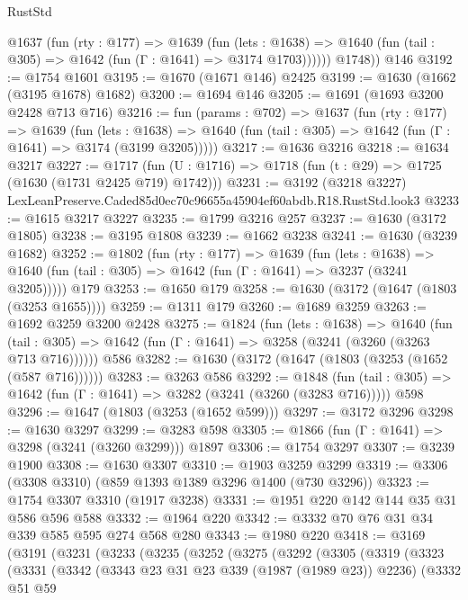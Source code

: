 \begin{lexlean}{RustStd}
\begin{coremodule}
          @1637
            (fun (rty : @177) =>
            @1639
              (fun (lets : @1638) =>
              @1640 (fun (tail : @305) => @1642 (fun (Γ : @1641) => @3174 @1703))))))
        @1748))
    @146
@3192 := @1754 @1601
@3195 := @1670 (@1671 @146) @2425
@3199 := @1630 (@1662 (@3195 @1678) @1682)
@3200 := @1694 @146
@3205 := @1691 (@1693 @3200 @2428 @713 @716)
@3216 := fun (params : @702) =>
  @1637
    (fun (rty : @177) =>
    @1639
      (fun (lets : @1638) =>
      @1640 (fun (tail : @305) => @1642 (fun (Γ : @1641) => @3174 (@3199 @3205)))))
@3217 := @1636 @3216
@3218 := @1634 @3217
@3227 := @1717 (fun (U : @1716) => @1718 (fun (t : @29) => @1725 (@1630 (@1731 @2425 @719) @1742)))
@3231 := @3192 (@3218 @3227) LexLeanPreserve.Caded85d0ec70c96655a45904ef60abdb.R18.RustStd.look3
@3233 := @1615 @3217 @3227
@3235 := @1799 @3216 @257
@3237 := @1630 (@3172 @1805)
@3238 := @3195 @1808
@3239 := @1662 @3238
@3241 := @1630 (@3239 @1682)
@3252 := @1802
    (fun (rty : @177) =>
    @1639
      (fun (lets : @1638) =>
      @1640 (fun (tail : @305) => @1642 (fun (Γ : @1641) => @3237 (@3241 @3205)))))
    @179
@3253 := @1650 @179
@3258 := @1630 (@3172 (@1647 (@1803 (@3253 @1655))))
@3259 := @1311 @179
@3260 := @1689 @3259
@3263 := @1692 @3259 @3200 @2428
@3275 := @1824
    (fun (lets : @1638) =>
    @1640 (fun (tail : @305) => @1642 (fun (Γ : @1641) => @3258 (@3241 (@3260 (@3263 @713 @716))))))
    @586
@3282 := @1630 (@3172 (@1647 (@1803 (@3253 (@1652 (@587 @716))))))
@3283 := @3263 @586
@3292 := @1848
    (fun (tail : @305) => @1642 (fun (Γ : @1641) => @3282 (@3241 (@3260 (@3283 @716)))))
    @598
@3296 := @1647 (@1803 (@3253 (@1652 @599)))
@3297 := @3172 @3296
@3298 := @1630 @3297
@3299 := @3283 @598
@3305 := @1866 (fun (Γ : @1641) => @3298 (@3241 (@3260 @3299))) @1897
@3306 := @1754 @3297
@3307 := @3239 @1900
@3308 := @1630 @3307
@3310 := @1903 @3259 @3299
@3319 := @3306 (@3308 @3310) (@859 @1393 @1389 @3296 @1400 (@730 @3296))
@3323 := @1754 @3307 @3310 (@1917 @3238)
@3331 := @1951 @220 @142 @144 @35 @31 @586 @596 @588
@3332 := @1964 @220
@3342 := @3332 @70 @76 @31 @34 @339 @585 @595 @274 @568 @280
@3343 := @1980 @220
@3418 := @3169
    (@3191
      (@3231
        (@3233
          (@3235
            (@3252
              (@3275
                (@3292
                  (@3305
                    (@3319
                      (@3323
                        (@3331
                          (@3342
                            (@3343 @23 @31 @23 @339 (@1987 (@1989 @23)) @2236)
                            (@3332
                              @51
                              @59

\end{coremodule}
\end{lexlean}
